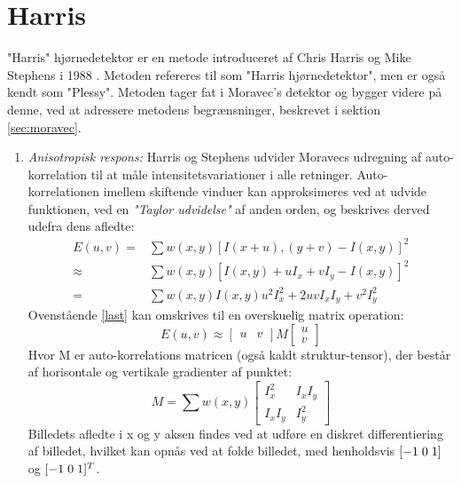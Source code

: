 \section{Harris}\label{sec:harris}
"Harris" hjørnedetektor er en metode introduceret af Chris Harris og Mike Stephens i 1988 \cite{harris}. Metoden refereres til som "Harris hjørnedetektor", men er også kendt som "Plessy". Metoden tager fat i Moravec's detektor og bygger videre på denne, ved at adressere metodens begrænsninger, beskrevet i sektion \ref{sec:moravec}.
\begin{enumerate}
\item{ \textit{Anisotropisk respons:} Harris og Stephens udvider Moravecs udregning af auto-korrelation til at måle intensitetsvariationer i alle retninger. Auto-korrelationen imellem skiftende vinduer kan approksimeres ved at udvide funktionen, ved en \textit{"Taylor udvidelse"} af anden orden, og beskrives derved udefra dens afledte:
\begin{subequations}
\begin{align}
E(u,v) = & \sum w(x,y)[I(x+u),(y+v)-I(x,y)]^2 \\
\approx & \sum w(x,y)[I(x,y)+u I_x+v I_y-I(x,y)]^2 \\
= & \sum w(x,y)I(x,y)u^2 I_x^2+2uv I_x I_y + v^2 I_y^2 \label{last}
\end{align}
\end{subequations}
Ovenstående \eqref{last} kan omskrives til en overskuelig matrix operation:
\begin{equation}
E(u,v) \approx
\begin{bmatrix}
        u & v
     \end{bmatrix}
M
\begin{bmatrix}
        u \\
        v
     \end{bmatrix}
\end{equation} 
Hvor M er auto-korrelations matricen (også kaldt struktur-tensor), der består af horisontale og vertikale gradienter af punktet:
\begin{equation}
M =  \sum w(x,y)
\begin{bmatrix}
I_x^2 & I_xI_y \\
I_xI_y & I_y^2
\label{M}
\end{bmatrix}
\end{equation}
Billedets afledte i x og y aksen findes ved at udføre en diskret differentiering af billedet, hvilket kan opnås
 ved at folde billedet, med henholdsvis $[-1 \hspace{0.1cm} 0 \hspace{0.1cm} 1]$ og $[-1 \hspace{0.1cm} 0 \hspace{0.1cm} 1]^T$. }

\end{enumerate}
